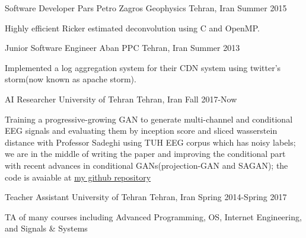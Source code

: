 \begin{cventries}
  \cventry
    {Software Developer} %
    {Pars Petro Zagros Geophysics} %
    {Tehran, Iran} %
    {Summer 2015} %
    {
      \begin{cvitems} %
        \item {Highly efficient Ricker estimated deconvolution using C and OpenMP.}
      \end{cvitems}
    }

  \cventry
    {Junior Software Engineer} %
    {Aban PPC} %
    {Tehran, Iran} %
    {Summer 2013} %
    {
      \begin{cvitems} %
        \item {Implemented a log aggregation system for their CDN system using twitter's storm(now known as apache storm).}
      \end{cvitems}
    }

\end{cventries}



\begin{cventries}

 \cventry
    {AI Researcher} %
    {University of Tehran} %
    {Tehran, Iran} %
    {Fall 2017-Now} %
    {
      \begin{cvitems} %
      	\item {Training a progressive-growing GAN to generate multi-channel and conditional EEG signals and evaluating them by inception score and sliced wasserstein distance with Professor Sadeghi using TUH EEG corpus which has noisy labels; we are in the middle of writing the paper and improving the conditional part with recent advances in conditional GANs(projection-GAN and SAGAN); the code is avaiable at \href{https://github.com/Separius/EEG-GAN}{my github repository}}
      \end{cvitems}
    }

 \cventry
    {Teacher Assistant} %
    {University of Tehran} %
    {Tehran, Iran} %
    {Spring 2014-Spring 2017} %
    {
      \begin{cvitems} %
        \item {TA of many courses including Advanced Programming, OS, Internet Engineering, and Signals \& Systems}
      \end{cvitems}
    }
\end{cventries}
